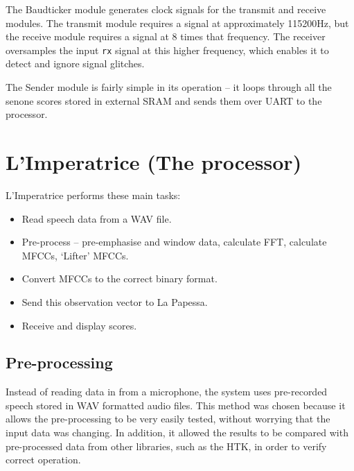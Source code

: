 		The Baudticker module generates clock signals for the transmit and receive modules.  The transmit module requires a signal at approximately 115200Hz, but the receive module requires a signal at 8 times that frequency.  The receiver oversamples the input \texttt{rx} signal at this higher frequency, which enables it to detect and ignore signal glitches.  %

		The Sender module is fairly simple in its operation -- it loops through all the senone scores stored in external SRAM and sends them over UART to the processor.



\section{L'Imperatrice (The processor)} %
\label{sec:l_imperatrice_processor}

	L'Imperatrice performs these main tasks:
	\begin{itemize}
		\item Read speech data from a WAV file.
		\item Pre-process -- pre-emphasise and window data, calculate FFT, calculate MFCCs, `Lifter' MFCCs.
		\item Convert MFCCs to the correct binary format.
		\item Send this observation vector to La Papessa.
		\item Receive and display scores.
	\end{itemize}


	\subsection{Pre-processing} %
	\label{sub:pre_processing}
		Instead of reading data in from a microphone, the system uses pre-recorded speech stored in WAV formatted audio files.  This method was chosen because it allows the pre-processing to be very easily tested, without worrying that the input data was changing.  In addition, it allowed the results to be compared with pre-processed data from other libraries, such as the HTK, in order to verify correct operation.


